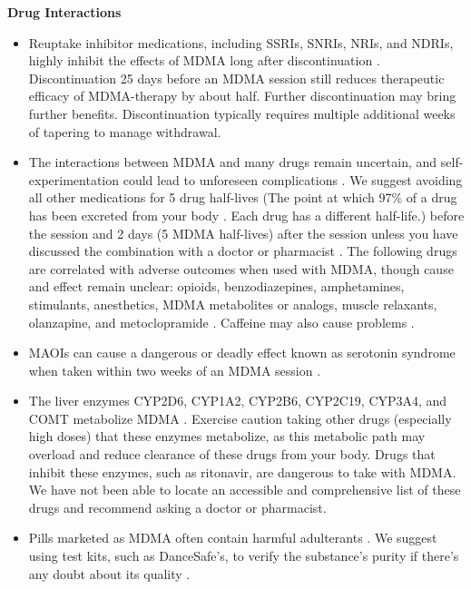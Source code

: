 \documentclass[12pt,letterpaper]{article}
\begin{document}
\vspace{\baselineskip}

\noindent \textbf{Drug Interactions}
\begin{itemize}
    \item Reuptake inhibitor medications, including SSRIs, SNRIs, NRIs, and NDRIs, highly inhibit the effects of MDMA long after discontinuation \cite{feducciaSSRIDiscontinuation}. Discontinuation 25 days before an MDMA session still reduces therapeutic efficacy of MDMA-therapy by about half. Further discontinuation may bring further benefits. Discontinuation typically requires multiple additional weeks of tapering to manage withdrawal.
    \item The interactions between MDMA and many drugs remain uncertain, and self-experimentation could lead to unforeseen complications \cite{cohenMDMADrugCombinations,sarparastDrugInteractions}. We suggest avoiding all other medications for 5 drug half-lives (The point at which 97\% of a drug has been excreted from your body . Each drug has a different half-life.) before the session and 2 days (5 MDMA half-lives) after the session unless you have discussed the combination with a doctor or pharmacist \cite{andradeHalf,torrePharmacology}. The following drugs are correlated with adverse outcomes when used with MDMA, though cause and effect remain unclear: opioids, benzodiazepines, amphetamines, stimulants, anesthetics, MDMA metabolites or analogs, muscle relaxants, olanzapine, and metoclopramide \cite{cohenMDMADrugCombinations}. Caffeine may also cause problems \cite{vanattouCaffeine}.
    \item MAOIs can cause a dangerous or deadly effect known as serotonin syndrome when taken within two weeks of an MDMA session \cite{malcolmSerotonin,edinoffInteractions}.
    \item The liver enzymes CYP2D6, CYP1A2, CYP2B6, CYP2C19, CYP3A4, and COMT metabolize MDMA \cite{torreEnzymes,sarparastDrugInteractions}. Exercise caution taking other drugs (especially high doses) that these enzymes metabolize, as this metabolic path may overload and reduce clearance of these drugs from your body. Drugs that inhibit these enzymes, such as ritonavir, are dangerous to take with MDMA. We have not been able to locate an accessible and comprehensive list of these drugs and recommend asking a doctor or pharmacist.
    \item Pills marketed as MDMA often contain harmful adulterants \cite{saleemiAdulterants}. We suggest using test kits, such as DanceSafe's, to verify the substance's purity if there's any doubt about its quality \cite{danceSafeTestingKit}.
\end{itemize}
\end{document}
